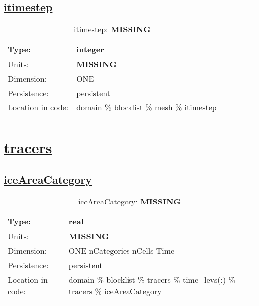 \subsection[itimestep]{\hyperref[sec:var_tab_mesh]{itimestep}}
\label{subsec:var_sec_mesh_itimestep}
\begin{center}
\begin{longtable}{| p{2.0in} | p{4.0in} |}
        \hline 
        Type: & integer \\
        \hline 
        Units: & {\bf \color{red} MISSING} \\
        \hline 
        Dimension: & ONE \\
        \hline 
        Persistence: & persistent \\
        \hline 
         Location in code: & domain \% blocklist \% mesh \% itimestep \\
         \hline 
    \caption{itimestep: {\bf \color{red} MISSING}}
\end{longtable}
\end{center}
\section[tracers]{\hyperref[sec:var_tab_tracers]{tracers}}
\label{sec:var_sec_tracers}
\subsection[iceAreaCategory]{\hyperref[sec:var_tab_tracers]{iceAreaCategory}}
\label{subsec:var_sec_tracers_iceAreaCategory}
\begin{center}
\begin{longtable}{| p{2.0in} | p{4.0in} |}
        \hline 
        Type: & real \\
        \hline 
        Units: & {\bf \color{red} MISSING} \\
        \hline 
        Dimension: & ONE nCategories nCells Time \\
        \hline 
        Persistence: & persistent \\
        \hline 
         Location in code: & domain \% blocklist \% tracers \% time\_levs(:) \% tracers \% iceAreaCategory \\
         \hline 
    \caption{iceAreaCategory: {\bf \color{red} MISSING}}
\end{longtable}
\end{center}
